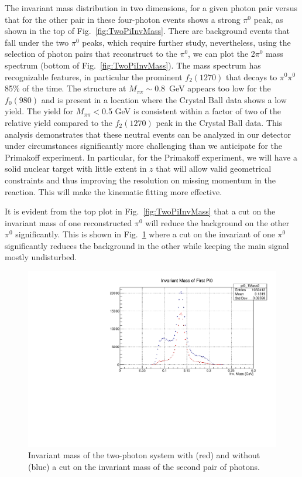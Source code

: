 The invariant mass distribution in two dimensions, for a given photon pair versus that for
the other pair in these four-photon events shows a
strong $\pi^0$ peak, as shown in the top of
Fig.~\ref{fig:TwoPiInvMass}. There are background events that fall
under the two $\pi^0$ peaks, which require further study,
nevertheless, using the selection of photon pairs that reconstruct to
the $\pi^0$, we can plot the 2$\pi^0$ mass spectrum (bottom of
Fig.~\ref{fig:TwoPiInvMass}). The mass spectrum has recognizable
features, in particular the prominent $f_2(1270)$ that decays to
$\pi^0\pi^0$ 85\% of the time. The structure at $M_{\pi\pi}\sim$0.8~GeV
appears too low for the $f_0(980)$ and is present in a location
where the Crystal Ball data \cite{Marsiske:1990hx} shows a low
yield. The yield for $M_{\pi\pi}<$0.5 GeV is consistent within a
factor of two of the relative yield compared to the $f_2(1270)$ peak in
the Crystal Ball data. This analysis demonstrates that these neutral
events can be analyzed in our detector under circumstances significantly more
challenging than we anticipate for the Primakoff
experiment. In particular, for the Primakoff experiment, we will have
a solid nuclear target with little extent in $z$ that will allow valid geometrical constraints
and thus improving the resolution on missing momentum in the reaction. This will
make the kinematic fitting more effective.

It is evident from the top plot in Fig.~\ref{fig:TwoPiInvMass} that a cut
on the invariant mass of one reconstructed $\pi^{0}$ will reduce the
background on the other $\pi^{0}$ significantly. This is shown in
Fig.~\ref{fig:pi0yield} where a cut on the invariant of one $\pi^{0}$
significantly reduces the background in the other while keeping the
main signal mostly undisturbed.
\begin{figure}[htp]
\centering\includegraphics[width=4.75in]{figures/pi0_inv_mass_withpi02cut.pdf}
\caption{Invariant mass of the two-photon system with (red) and
  without (blue) a cut on the invariant mass of the second pair of
  photons.
\label{fig:pi0yield}}
\end{figure}

